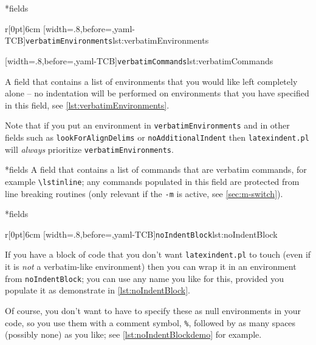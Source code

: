 *{fields} 

\begin{wrapfigure}[14]{r}[0pt]{6cm}
[width=.8\linewidth,before=\centering,yaml-TCB]{\texttt{verbatimEnvironments}}{lst:verbatimEnvironments}

\vspace{.2cm}
[width=.8\linewidth,before=\centering,yaml-TCB]{\texttt{verbatimCommands}}{lst:verbatimCommands}
\end{wrapfigure}
A field that contains a list of environments
that you would like left completely alone -- no indentation will be performed
on environments that you have specified in this field, see \cref{lst:verbatimEnvironments}.

Note that if  you put an environment in \texttt{verbatimEnvironments}
and in other fields such as \texttt{lookForAlignDelims} or \texttt{noAdditionalIndent}
then \texttt{latexindent.pl} will \emph{always} prioritize \texttt{verbatimEnvironments}.

*{fields}
A field that contains a list of commands that are verbatim commands, for example
\lstinline|\lstinline|; any commands populated in this field are protected from line breaking 
routines (only relevant if the \texttt{-m} is active, see \vref{sec:m-switch}).

*{fields} 

\begin{wrapfigure}[8]{r}[0pt]{6cm}
[width=.8\linewidth,before=\centering,yaml-TCB]{\texttt{noIndentBlock}}{lst:noIndentBlock}
\end{wrapfigure}
If you have a block of code that you don't want \texttt{latexindent.pl} to touch (even if it is \emph{not} a verbatim-like
environment) then you can wrap it in an environment from \texttt{noIndentBlock};
you can use any name you like for this, provided you populate it as demonstrate in
\cref{lst:noIndentBlock}.

Of course, you don't want to have to specify these as null environments
in your code, so you use them with a comment symbol, \lstinline!%!, followed
by as many spaces (possibly none) as you like; see \cref{lst:noIndentBlockdemo} for
example.

